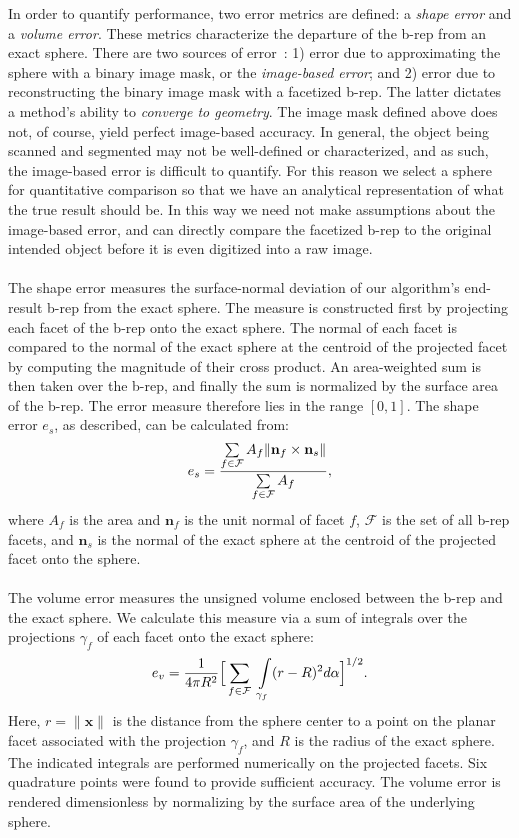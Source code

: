 In order to quantify performance, two error metrics are defined: a {\em shape error} and a {\em volume error}. These metrics characterize the departure of the b-rep from an exact sphere. There are two sources of error~\cite{young_2008}: 1) error due to approximating the sphere with a binary image mask, or the {\em image-based error}; and 2) error due to reconstructing the binary image mask with a facetized b-rep. The latter dictates a method's ability to {\em converge to geometry}. The image mask defined above does not, of course, yield perfect image-based accuracy. {In general, the object being scanned and segmented may not be well-defined or characterized, and as such, the image-based error is difficult to quantify. For this reason we select a sphere for quantitative comparison so that we have an analytical representation of what the true result should be. In this way we need not make assumptions about the image-based error, and can directly compare the facetized b-rep to the original intended object before it is even digitized into a raw image.} \\ \\
%
The shape error measures the surface-normal deviation of our algorithm's end-result b-rep from the exact sphere. The measure is constructed first by projecting each facet of the b-rep onto the exact sphere. The normal of each facet is compared to the normal of the exact sphere at the centroid of the projected facet by computing the magnitude of their cross product. An area-weighted sum is then taken over the b-rep, and finally the sum is normalized by the surface area of the b-rep. The error measure therefore lies in the range $\left [0,1\right]$. The shape error $e_s$, as described, can be calculated from:
\begin{equation} 
	e_s = \frac{ \sum \limits_{f\in\mathcal{F}} A_f \lVert {\bf n}_f \times {\bf n}_s \rVert}{\sum \limits_{f\in\mathcal{F}} A_f},
\end{equation}
where $A_f$ is the area and ${\bm n}_f$ is the unit normal of facet $f$, $\mathcal{F}$ is the set of all b-rep facets, and ${\bm n}_s$ is the normal of the exact sphere at the centroid of the projected facet onto the sphere. \\ \\
%
The volume error measures the unsigned volume enclosed between the b-rep and the exact sphere. We calculate this measure via a sum of integrals over the projections $\gamma_f$ of each facet onto the exact sphere: 
\begin{equation}
\label{vol err}
	e_v = \frac{1}{4\pi R^2} \Big[\sum \limits_{f \in \mathcal{F}\textsl{}} \ \int \limits_{\gamma_f} (r - R)^2 d\alpha \Big]^{1/2} .
\end{equation}
Here, $r = \lVert {\bm x} \rVert$ is the distance from the sphere center to a point on the planar facet associated with the projection $\gamma_f$, and $R$ is the radius of the exact sphere.  The indicated integrals are performed numerically on the projected facets. Six quadrature points were found to provide sufficient accuracy. The volume error is rendered dimensionless by normalizing by the surface area of the underlying sphere.
